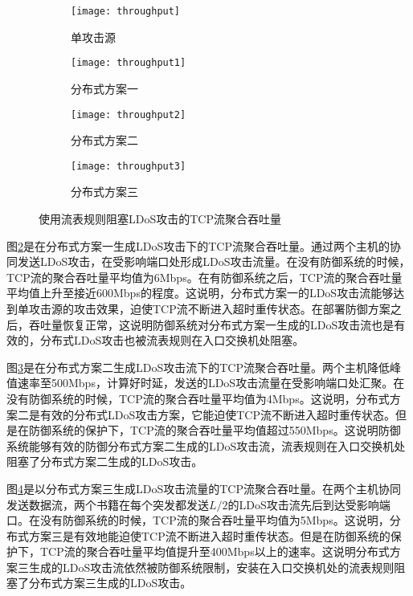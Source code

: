 \begin{figure}
    \begin{subfigure}{.49\textwidth}
        \centering
        \texttt{[image: throughput]}
        \caption{单攻击源}
        \label{fig:throughput-single}
    \end{subfigure}
    \begin{subfigure}{.49\textwidth}
        \centering
        \texttt{[image: throughput1]}
        \caption{分布式方案一}
        \label{fig:throughput-2h-mod1}
    \end{subfigure}

    \begin{subfigure}{.49\textwidth}
        \centering
        \texttt{[image: throughput2]}
        \caption{分布式方案二}
        \label{fig:throughput-2h-mod2}
    \end{subfigure}
    \begin{subfigure}{.49\textwidth}
        \centering
        \texttt{[image: throughput3]}
        \caption{分布式方案三}
        \label{fig:throughput-2h-mod3}
    \end{subfigure}


    \caption{使用流表规则阻塞LDoS攻击的TCP流聚合吞吐量}
    \label{fig:throughput-all}
\end{figure}

图\ref{fig:throughput-2h-mod1}是在分布式方案一生成LDoS攻击下的TCP流聚合吞吐量。通过两个主机的协同发送LDoS攻击，在受影响端口处形成LDoS攻击流量。在没有防御系统的时候，TCP流的聚合吞吐量平均值为6Mbps。在有防御系统之后，TCP流的聚合吞吐量平均值上升至接近600Mbps的程度。这说明，分布式方案一的LDoS攻击流能够达到单攻击源的攻击效果，迫使TCP流不断进入超时重传状态。在部署防御方案之后，吞吐量恢复正常，这说明防御系统对分布式方案一生成的LDoS攻击流也是有效的，分布式LDoS攻击也被流表规则在入口交换机处阻塞。

图\ref{fig:throughput-2h-mod2}是在分布式方案二生成LDoS攻击流下的TCP流聚合吞吐量。两个主机降低峰值速率至500Mbps，计算好时延，发送的LDoS攻击流量在受影响端口处汇聚。在没有防御系统的时候，TCP流的聚合吞吐量平均值为4Mbps。这说明，分布式方案二是有效的分布式LDoS攻击方案，它能迫使TCP流不断进入超时重传状态。但是在防御系统的保护下，TCP流的聚合吞吐量平均值超过550Mbps。这说明防御系统能够有效的防御分布式方案二生成的LDoS攻击流，流表规则在入口交换机处阻塞了分布式方案二生成的LDoS攻击。

图\ref{fig:throughput-2h-mod3}是以分布式方案三生成LDoS攻击流量的TCP流聚合吞吐量。在两个主机协同发送数据流，两个书籍在每个突发都发送$L/2$的LDoS攻击流先后到达受影响端口。在没有防御系统的时候，TCP流的聚合吞吐量平均值为5Mbps。这说明，分布式方案三是有效地能迫使TCP流不断进入超时重传状态。但是在防御系统的保护下，TCP流的聚合吞吐量平均值提升至400Mbps以上的速率。这说明分布式方案三生成的LDoS攻击流依然被防御系统限制，安装在入口交换机处的流表规则阻塞了分布式方案三生成的LDoS攻击。

